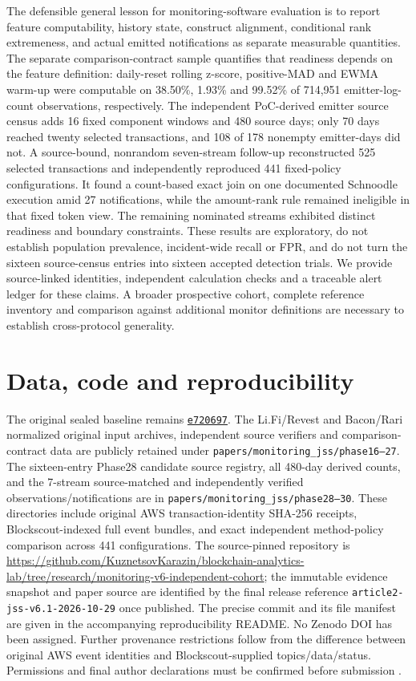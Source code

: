 \documentclass[preprint,12pt,authoryear]{elsarticle}
\begin{document}
The defensible general lesson for monitoring-software evaluation is to report feature computability, history state, construct alignment, conditional rank extremeness, and actual emitted notifications as separate measurable quantities. The separate comparison-contract sample quantifies that readiness depends on the feature definition: daily-reset rolling z-score, positive-MAD and EWMA warm-up were computable on 38.50\%, 1.93\% and 99.52\% of 714,951 emitter-log-count observations, respectively. The independent PoC-derived emitter source census adds 16 fixed component windows and 480 source days; only 70 days reached twenty selected transactions, and 108 of 178 nonempty emitter-days did not. A source-bound, nonrandom seven-stream follow-up reconstructed 525 selected transactions and independently reproduced 441 fixed-policy configurations. It found a count-based exact join on one documented Schnoodle execution amid 27 notifications, while the amount-rank rule remained ineligible in that fixed token view. The remaining nominated streams exhibited distinct readiness and boundary constraints. These results are exploratory, do not establish population prevalence, incident-wide recall or FPR, and do not turn the sixteen source-census entries into sixteen accepted detection trials. We provide source-linked identities, independent calculation checks and a traceable alert ledger for these claims. A broader prospective cohort, complete reference inventory and comparison against additional monitor definitions are necessary to establish cross-protocol generality.

\section*{Data, code and reproducibility}
The original sealed baseline remains \href{https://github.com/KuznetsovKarazin/blockchain-analytics-lab/commit/e720697bc3986dd291a7047c580cf973ae6e5567}{\texttt{e720697}}. The Li.Fi/Revest and Bacon/Rari normalized original input archives, independent source verifiers and comparison-contract data are publicly retained under \texttt{papers/monitoring\_jss/phase16--27}. The sixteen-entry Phase28 candidate source registry, all 480-day derived counts, and the 7-stream source-matched and independently verified observations/notifications are in \texttt{papers/monitoring\_jss/phase28--30}. These directories include original AWS transaction-identity SHA-256 receipts, Blockscout-indexed full event bundles, and exact independent method-policy comparison across 441 configurations. The source-pinned repository is \url{https://github.com/KuznetsovKarazin/blockchain-analytics-lab/tree/research/monitoring-v6-independent-cohort}; the immutable evidence snapshot and paper source are identified by the final release reference \texttt{article2-jss-v6.1-2026-10-29} once published. The precise commit and its file manifest are given in the accompanying reproducibility README. No Zenodo DOI has been assigned. Further provenance restrictions follow from the difference between original AWS event identities and Blockscout-supplied topics/data/status. Permissions and final author declarations must be confirmed before submission \citep{Kuznetsov2026Artifacts}.
\end{document}
